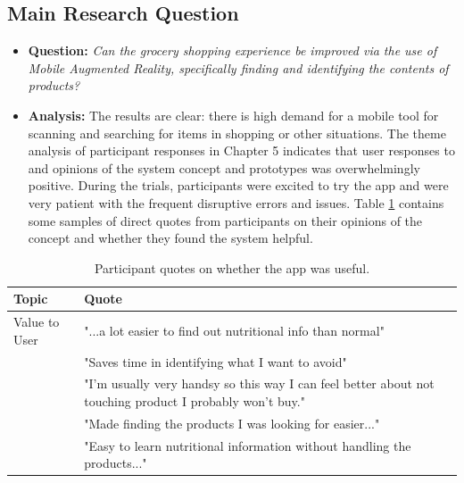 \documentclass[thesis]{fputhesis}
\newcommand{\ra}[1]{\renewcommand{\arraystretch}{#1}}
\begin{document}
\begin{body}
\section{Main Research Question}
\begin{itemize}
    \item[] \textbf{Question: } \textit{Can the grocery shopping experience be improved via the use of Mobile Augmented Reality, specifically finding and identifying the contents of products?}
    \item[] \textbf{Analysis: } The results are clear: there is high demand for a mobile tool for scanning and searching for items in shopping or other situations. The theme analysis of participant responses in Chapter 5 indicates that user responses to and opinions of the system concept and prototypes was overwhelmingly positive. During the trials, participants were excited to try the app and were very patient with the frequent disruptive errors and issues. Table \ref{tab:use-quotes} contains some samples of direct quotes from participants on their opinions of the concept and whether they found the system helpful. 

\end{itemize}

\begin{table}[h]\centering
\caption{Participant quotes on whether the app was useful.}
\label{tab:use-quotes}
\ra{1.2}
    \begin{tabular}{@{}l >{\raggedright\arraybackslash}p{} @{}}
        \toprule
            \textbf{Topic} & \textbf{Quote} \\
        \midrule
            Value to User & "...a lot easier to find out nutritional info than normal" \\  
            & "Saves time in identifying what I want to avoid"           \\  
            & "I'm usually very handsy so this way I can feel better about not touching product I probably won't buy." \\ 
            & "Made finding the products I was looking for easier..."    \\  
            & "Easy to learn nutritional information without handling the products..." \\
        \bottomrule
    \end{tabular}%
\end{table}


\end{body}
\end{document}
